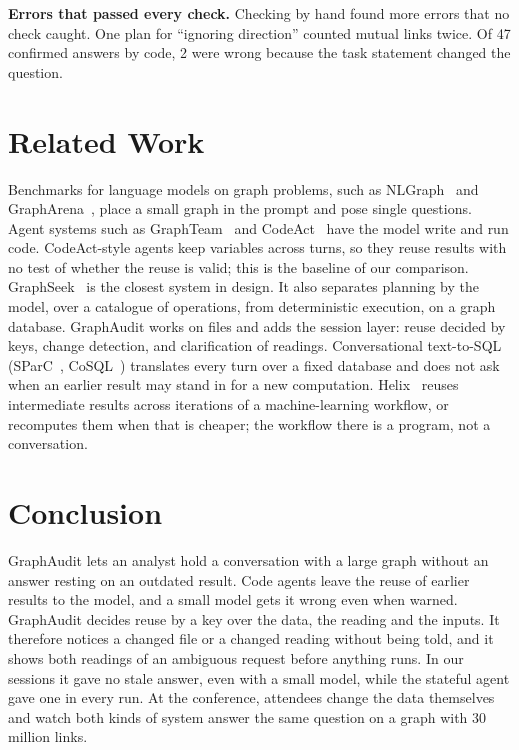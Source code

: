 \documentclass[sigconf,9pt]{acmart}
\newcommand{\sys}{GraphAudit}
\begin{document}
\textbf{Errors that passed every check.} Checking by hand found more errors that no check caught.
One plan for ``ignoring direction'' counted mutual links twice. Of 47 confirmed answers by
code, 2 were wrong because the task statement changed the question.

\section{Related Work}

Benchmarks for language models on graph problems, such as NLGraph~\cite{nlgraph} and
GraphArena~\cite{grapharena}, place a small graph in the prompt and pose single questions. Agent systems
such as GraphTeam~\cite{graphteam} and CodeAct~\cite{codeact} have the model write and run code. CodeAct-style
agents keep variables across turns, so they reuse results with no test of whether the reuse is valid; this
is the baseline of our comparison. GraphSeek~\cite{graphseek} is the closest system in design. It also
separates planning by the model, over a catalogue of operations, from deterministic execution, on a graph
database. \sys{} works on files and adds the session layer: reuse decided by keys, change detection, and
clarification of readings.
Conversational text-to-SQL (SParC~\cite{sparc}, CoSQL~\cite{cosql}) translates every turn over a fixed
database and does not ask when an earlier result may stand in for a new computation. Helix~\cite{helix} reuses intermediate results across iterations of a machine-learning workflow, or
recomputes them when that is cheaper; the workflow there is a program, not a conversation.

\section{Conclusion}

\sys{} lets an analyst hold a conversation with a large graph without an answer resting on an outdated
result. Code agents leave the reuse of earlier results to the model, and a small model gets it wrong even when warned. \sys{} decides reuse by a key over the data, the reading and the inputs. It therefore
notices a changed file or a changed reading without being told, and it shows both readings of an ambiguous
request before anything runs. In our sessions it gave no stale answer, even with a small model, while the
stateful agent gave one in every run. At the conference, attendees change the data themselves and watch
both kinds of system answer the same question on a graph with 30 million links.



\end{document}
